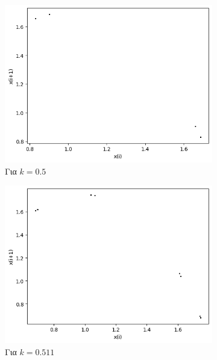 \begin{figure}[ht]
\begin{subfigure}[b]{0.4\textwidth}
		\includegraphics[width=\textwidth]{LateX images/graphs q03/g5}
		\caption{Για $k=0.5$}
		\label{f:k17}
	\end{subfigure}
	\hfill
	\begin{subfigure}[b]{0.4\textwidth}
		\centering
		\includegraphics[width=\textwidth]{LateX images/graphs q03/g6}
		\caption{Για $k=0.511$}
		\label{f:k18}
	\end{subfigure}
	\hfill
	\begin{subfigure}[b]{0.4\textwidth}
		\centering

\end{subfigure}
\end{figure}
